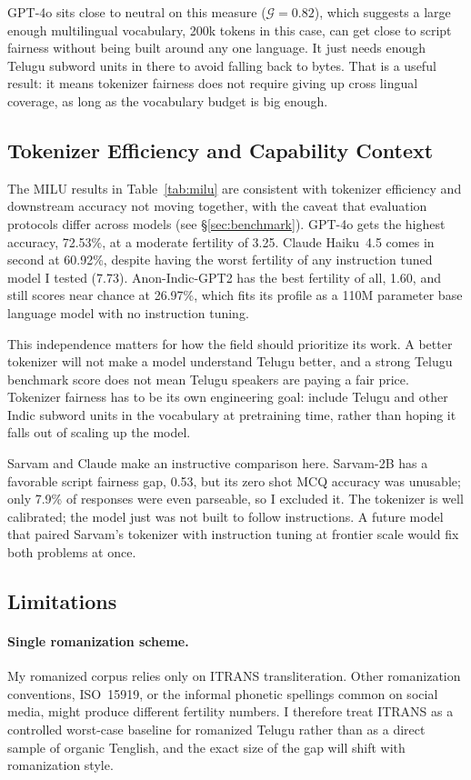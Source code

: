 ﻿\documentclass[11pt]{article}
\begin{document}
GPT-4o sits close to neutral on this measure ($\mathcal{G} = 0.82$),
which suggests a large enough multilingual vocabulary, 200k tokens
in this case, can get close to script fairness without being built
around any one language. It just needs enough Telugu subword units
in there to avoid falling back to bytes. That is a useful result: it
means tokenizer fairness does not require giving up cross lingual
coverage, as long as the vocabulary budget is big enough.

\subsection{Tokenizer Efficiency and Capability Context}

The MILU results in Table~\ref{tab:milu} are consistent with
tokenizer efficiency and downstream accuracy not moving together,
with the caveat that evaluation protocols differ across models
(see \S\ref{sec:benchmark}). GPT-4o
gets the highest accuracy, 72.53\%, at a moderate fertility of 3.25.
Claude Haiku~4.5 comes in second at 60.92\%, despite having the
worst fertility of any instruction tuned model I tested (7.73).
Anon-Indic-GPT2 has the best fertility of all, 1.60, and still
scores near chance at 26.97\%, which fits its profile as a 110M
parameter base language model with no instruction tuning.

This independence matters for how the field should prioritize its
work. A better tokenizer will not make a model understand Telugu
better, and a strong Telugu benchmark score does not mean Telugu
speakers are paying a fair price. Tokenizer fairness has to be its
own engineering goal: include Telugu and other Indic subword units
in the vocabulary at pretraining time, rather than hoping it falls
out of scaling up the model.

Sarvam and Claude make an instructive comparison here. Sarvam-2B has
a favorable script fairness gap, 0.53, but its zero shot MCQ
accuracy was unusable; only 7.9\% of responses were even parseable,
so I excluded it. The tokenizer is well calibrated; the model just
was not built to follow instructions. A future model that paired
Sarvam's tokenizer with instruction tuning at frontier scale would
fix both problems at once.

\subsection{Limitations}
\label{sec:limitations}

\paragraph{Single romanization scheme.}
My romanized corpus relies only on ITRANS transliteration. Other
romanization conventions, ISO~15919, or the informal phonetic
spellings common on social media, might produce different fertility
numbers. I therefore treat ITRANS as a controlled worst-case
baseline for romanized Telugu rather than as a direct sample of
organic Tenglish, and the exact size of the gap will shift with
romanization style.
\end{document}
